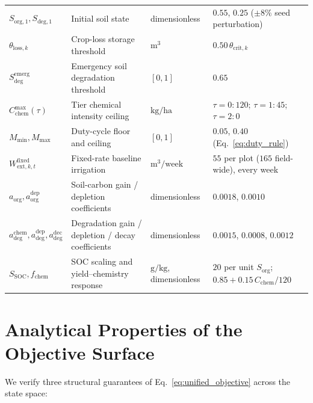 \documentclass[11pt,a4paper]{article}
\begin{document}
\begin{table}[t]
{\begin{tabular}{@{}llll@{}}
    $S_{\mathrm{org},1}, S_{\mathrm{deg},1}$ & Initial soil state & dimensionless & $0.55$, $0.25$ ($\pm 8\%$ seed perturbation) \\
    $\theta_{\mathrm{loss},k}$ & Crop-loss storage threshold & $\mathrm{m}^3$ & $0.50\,\theta_{\mathrm{crit},k}$ \\
    $S_{\mathrm{deg}}^{\mathrm{emerg}}$ & Emergency soil degradation threshold & $[0, 1]$ & $0.65$ \\
    $C_{\mathrm{chem}}^{\max}(\tau)$ & Tier chemical intensity ceiling & $\mathrm{kg/ha}$ & $\tau=0: 120$; $\tau=1: 45$; $\tau=2: 0$ \\
    $M_{\min}, M_{\max}$ & Duty-cycle floor and ceiling & $[0, 1]$ & $0.05$, $0.40$ (Eq.~\eqref{eq:duty_rule}) \\
    $W^{\mathrm{fixed}}_{\mathrm{ext},k,t}$ & Fixed-rate baseline irrigation & $\mathrm{m}^3/\text{week}$ & $55$ per plot ($165$ field-wide), every week \\
    $a_{\mathrm{org}}, a^{\mathrm{dep}}_{\mathrm{org}}$ & Soil-carbon gain / depletion coefficients & dimensionless & $0.0018$, $0.0010$ \\
    $a^{\mathrm{chem}}_{\mathrm{deg}}, a^{\mathrm{dep}}_{\mathrm{deg}}, a^{\mathrm{dec}}_{\mathrm{deg}}$ & Degradation gain / depletion / decay coefficients & dimensionless & $0.0015$, $0.0008$, $0.0012$ \\
    $S_{\mathrm{SOC}}, f_{\mathrm{chem}}$ & SOC scaling and yield--chemistry response & $\mathrm{g/kg}$, dimensionless & $20$ per unit $S_{\mathrm{org}}$; $0.85+0.15\,C_{\mathrm{chem}}/120$ \\
    \bottomrule
  \end{tabular}}
\end{table}

\section{Analytical Properties of the Objective Surface}
We verify three structural guarantees of Eq.~\eqref{eq:unified_objective} across the state space:
\end{document}
